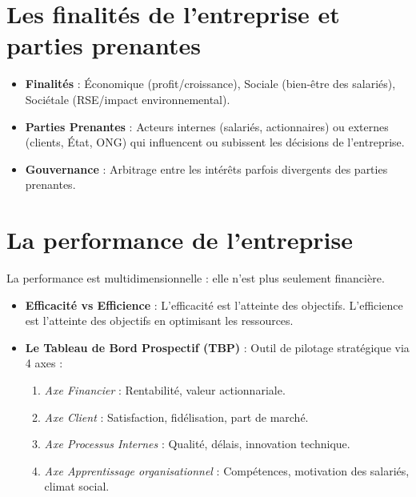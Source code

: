 \documentclass[11pt,a4paper]{article}
\begin{document}
\section{Les finalités de l'entreprise et parties prenantes}
\begin{itemize}[label=$\bullet$]
    \item \textbf{Finalités} : Économique (profit/croissance), Sociale (bien-être des salariés), Sociétale (RSE/impact environnemental).
    \item \textbf{Parties Prenantes} : Acteurs internes (salariés, actionnaires) ou externes (clients, État, ONG) qui influencent ou subissent les décisions de l'entreprise.
    \item \textbf{Gouvernance} : Arbitrage entre les intérêts parfois divergents des parties prenantes.
\end{itemize}

\section{La performance de l'entreprise}
La performance est multidimensionnelle : elle n'est plus seulement financière.
\begin{itemize}[label=$\bullet$]
    \item \textbf{Efficacité vs Efficience} : L'efficacité est l'atteinte des objectifs. L'efficience est l'atteinte des objectifs en optimisant les ressources.
    \item \textbf{Le Tableau de Bord Prospectif (TBP)} : Outil de pilotage stratégique via 4 axes :
    \begin{enumerate}
        \item \textit{Axe Financier} : Rentabilité, valeur actionnariale.
        \item \textit{Axe Client} : Satisfaction, fidélisation, part de marché.
        \item \textit{Axe Processus Internes} : Qualité, délais, innovation technique.
        \item \textit{Axe Apprentissage organisationnel} : Compétences, motivation des salariés, climat social.
    \end{enumerate}
\end{itemize}
\end{document}
